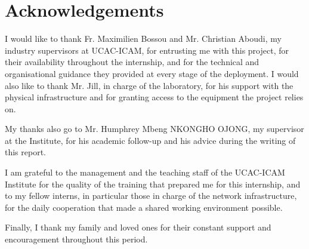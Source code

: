 \chapter*{Acknowledgements}

I would like to thank Fr. Maximilien Bossou and Mr. Christian Aboudi, my industry supervisors at UCAC-ICAM, for entrusting me with this project, for their availability throughout the internship, and for the technical and organisational guidance they provided at every stage of the deployment. I would also like to thank Mr. Jill, in charge of the laboratory, for his support with the physical infrastructure and for granting access to the equipment the project relies on.

My thanks also go to Mr. Humphrey Mbeng NKONGHO OJONG, my supervisor at the Institute, for his academic follow-up and his advice during the writing of this report.

I am grateful to the management and the teaching staff of the UCAC-ICAM Institute for the quality of the training that prepared me for this internship, and to my fellow interns, in particular those in charge of the network infrastructure, for the daily cooperation that made a shared working environment possible.

Finally, I thank my family and loved ones for their constant support and encouragement throughout this period.

\clearpage

